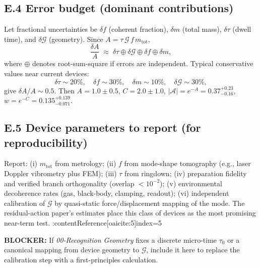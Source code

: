\documentclass[11pt,letterpaper]{article}
\begin{document}
\subsection*{E.4 Error budget (dominant contributions)}

Let fractional uncertainties be \(\delta f\) (coherent fraction), \(\delta m\) (total mass), \(\delta\tau\) (dwell time), and \(\delta\mathcal G\) (geometry). Since \(A=\tau\,\mathcal G\,f\,m_{\mathrm{tot}}\),
\[
\frac{\delta A}{A}\;\approx\;\delta\tau\oplus\delta\mathcal G\oplus\delta f\oplus\delta m,
\]
where \(\oplus\) denotes root-sum-square if errors are independent. Typical conservative values near current devices:
\[
\delta\tau\sim 20\%,\quad \delta f\sim 30\%,\quad \delta m\sim 10\%,\quad \delta\mathcal G\sim 30\%,
\]
give \(\delta A/A\sim 0.5\). Then \(A=1.0\pm 0.5\), \(C=2.0\pm 1.0\), \(|\mathcal A|=e^{-A}=0.37^{+0.23}_{-0.16}\), \(w=e^{-C}=0.135^{+0.139}_{-0.071}\).

\subsection*{E.5 Device parameters to report (for reproducibility)}

Report: (i) \(m_{\mathrm{tot}}\) from metrology; (ii) \(f\) from mode-shape tomography (e.g., laser Doppler vibrometry plus FEM); (iii) \(\tau\) from ringdown; (iv) preparation fidelity and verified branch orthogonality (overlap \(<10^{-2}\)); (v) environmental decoherence rates (gas, black-body, clamping, readout); (vi) independent calibration of \(\mathcal G\) by quasi-static force/displacement mapping of the mode. The residual-action paper’s estimates place this class of devices as the most promising near-term test. :contentReference[oaicite:5]{index=5}

\medskip
\noindent\textbf{BLOCKER:} If \emph{00‑Recognition Geometry} fixes a discrete micro-time \(\tau_0\) or a canonical mapping from device geometry to \(\mathcal G\), include it here to replace the calibration step with a first-principles calculation.
\end{document}
